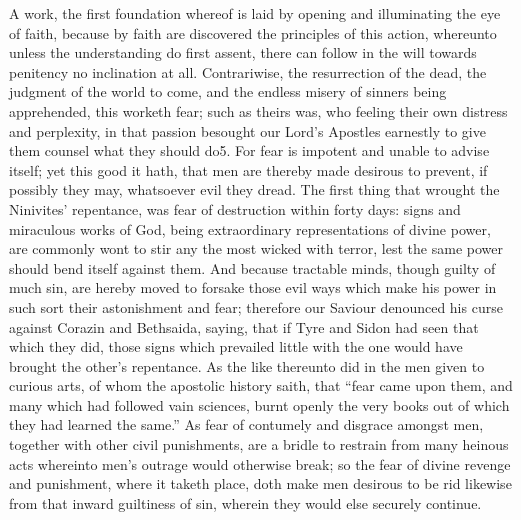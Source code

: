 A work, the first foundation whereof is laid by opening and illuminating the eye of faith, because by faith are discovered the principles of this action, whereunto unless the understanding do first assent, there can follow in the will towards penitency no inclination at all. Contrariwise, the resurrection of the dead, the judgment of the world to come, and the endless misery of sinners being apprehended, this worketh fear; such as theirs was, who feeling their own distress and perplexity, in that passion besought our Lord’s Apostles earnestly to give them counsel what they should do5. For fear is impotent and unable to advise itself; yet this good it hath, that men are thereby made desirous to prevent, if possibly they may, whatsoever evil they dread. The first thing that wrought the Ninivites’ repentance, was fear of destruction within forty days: signs and miraculous works of God, being extraordinary representations of divine power, are commonly wont to stir any the most wicked with terror, lest the same power should bend itself against them. And because tractable minds, though guilty of much sin, are hereby moved to forsake those evil ways which make his power in such sort their astonishment and fear; therefore our Saviour denounced his curse against Corazin and Bethsaida, saying, that if Tyre and Sidon had seen that which they did, those signs which prevailed little with the one would have brought the other’s repentance. As the like thereunto did in the men given to curious arts, of whom the apostolic history saith, that “fear came upon them, and many which had followed vain sciences, burnt openly the very books out of which they had learned the same.” As fear of contumely and disgrace amongst men, together with other civil punishments, are a bridle to restrain from many heinous acts whereinto men’s outrage would otherwise break; so the fear of divine revenge and punishment, where it taketh place, doth make men desirous to be rid likewise from that inward guiltiness of sin, wherein they would else securely continue.

